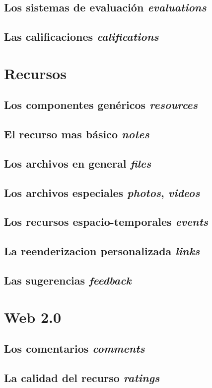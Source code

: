 \subsection{Los sistemas de evaluación \emph{evaluations}}
\subsection{Las calificaciones \emph{califications}}

\section{Recursos}
\subsection{Los componentes genéricos \emph{resources}}
\subsection{El recurso mas básico \emph{notes}}
\subsection{Los archivos en general \emph{files}}
\subsection{Los archivos especiales \emph{photos}, \emph{videos}}
\subsection{Los recursos espacio-temporales \emph{events}}
\subsection{La reenderizacion personalizada \emph{links}}
\subsection{Las sugerencias \emph{feedback}}

\section{Web 2.0}
\subsection{Los comentarios \emph{comments}}
\subsection{La calidad del recurso \emph{ratings}}
